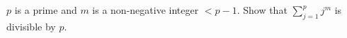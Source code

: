 $p$ is a prime and $m$ is a non-negative integer $< p-1$.
Show that $ \sum_{j=1}^p j^m$ is divisible by $p$.